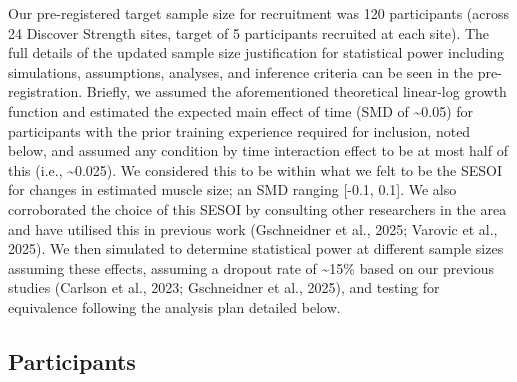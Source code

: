 \documentclass[
]{article}
\begin{document}
Our pre-registered target sample size for recruitment was 120
participants (across 24 Discover Strength sites, target of 5
participants recruited at each site). The full details of the updated
sample size justification for statistical power including simulations,
assumptions, analyses, and inference criteria can be seen in the
pre-registration. Briefly, we assumed the aforementioned theoretical
linear-log growth function and estimated the expected main effect of
time (SMD of \textasciitilde0.05) for participants with the prior
training experience required for inclusion, noted below, and assumed any
condition by time interaction effect to be at most half of this (i.e.,
\textasciitilde0.025). We considered this to be within what we felt to
be the SESOI for changes in estimated muscle size; an SMD ranging
{[}-0.1, 0.1{]}. We also corroborated the choice of this SESOI by
consulting other researchers in the area and have utilised this in
previous work (Gschneidner et al., 2025; Varovic et al., 2025). We then
simulated to determine statistical power at different sample sizes
assuming these effects, assuming a dropout rate of \textasciitilde15\%
based on our previous studies (Carlson et al., 2023; Gschneidner et al.,
2025), and testing for equivalence following the analysis plan detailed
below.

\subsection{Participants}\label{participants}
\end{document}
